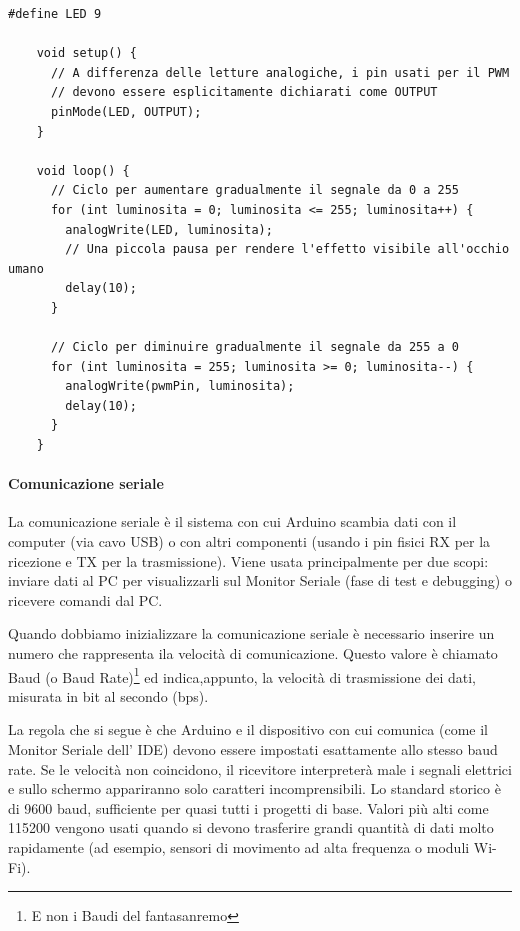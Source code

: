 \documentclass[12pt, letterpaper]{book}
\begin{document}
    \begin{lstlisting}[style=myArduino, basicstyle=\ttfamily\footnotesize, caption={Esempio uscita analogica}, captionpos=b, label=code:pwm]
    #define LED 9 

    void setup() {
      // A differenza delle letture analogiche, i pin usati per il PWM 
      // devono essere esplicitamente dichiarati come OUTPUT
      pinMode(LED, OUTPUT);
    }

    void loop() {
      // Ciclo per aumentare gradualmente il segnale da 0 a 255
      for (int luminosita = 0; luminosita <= 255; luminosita++) {
        analogWrite(LED, luminosita);
        // Una piccola pausa per rendere l'effetto visibile all'occhio umano
        delay(10); 
      }

      // Ciclo per diminuire gradualmente il segnale da 255 a 0
      for (int luminosita = 255; luminosita >= 0; luminosita--) {
        analogWrite(pwmPin, luminosita);
        delay(10);
      }
    }
    \end{lstlisting}

    \paragraph{Comunicazione seriale}

    La comunicazione seriale è il sistema con cui Arduino scambia dati con il computer (via cavo USB) o con altri componenti (usando i pin fisici RX per la ricezione e TX per la trasmissione). Viene usata principalmente per due scopi: inviare dati al PC per visualizzarli sul Monitor Seriale (fase di test e debugging) o ricevere comandi dal PC. 

    Quando dobbiamo inizializzare la comunicazione seriale è necessario inserire un numero che rappresenta ila velocità di comunicazione. Questo valore è chiamato Baud (o Baud Rate)\footnote{E non i Baudi del fantasanremo} ed indica,appunto, la velocità di trasmissione dei dati, misurata in bit al secondo (bps). 

    La regola che si segue è che Arduino e il dispositivo con cui comunica (come il Monitor Seriale dell' IDE) devono essere impostati esattamente allo stesso baud rate. Se le velocità non coincidono, il ricevitore interpreterà male i segnali elettrici e sullo schermo appariranno solo caratteri incomprensibili. Lo standard storico è di 9600 baud, sufficiente per quasi tutti i progetti di base. Valori più alti come 115200 vengono usati quando si devono trasferire grandi quantità di dati molto rapidamente (ad esempio, sensori di movimento ad alta frequenza o moduli Wi-Fi).
\end{document}
